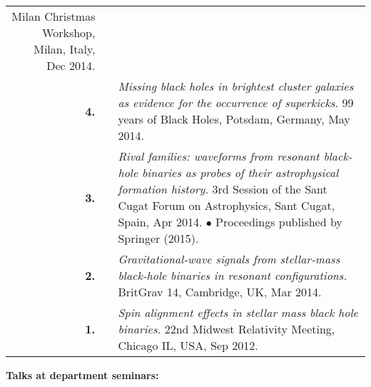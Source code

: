 {\begin{longtable}{rp{0.3cm}p{15.8cm}}
Milan Christmas Workshop, Milan, Italy, Dec 2014.
\vspace{0.05cm}\\
%
\textbf{4.} &  & \textit{Missing black holes in brightest cluster galaxies as evidence for the occurrence of superkicks.}
\newline{}
99 years of Black Holes, Potsdam, Germany, May 2014.
\vspace{0.05cm}\\
%
\textbf{3.} &  & \textit{Rival families: waveforms from resonant black-hole binaries as probes of their astrophysical formation history.}
\newline{}
3rd Session of the Sant Cugat Forum on Astrophysics, Sant Cugat, Spain, Apr 2014.
\newline{}
\textcolor{color1}{$\bullet$} Proceedings published by Springer (2015).
\vspace{0.05cm}\\
%
\textbf{2.} &  & \textit{Gravitational-wave signals from stellar-mass black-hole binaries in resonant configurations.}
\newline{}
BritGrav 14, Cambridge, UK, Mar 2014.
\vspace{0.05cm}\\
%
\textbf{1.} &  & \textit{Spin alignment effects in stellar mass black hole binaries.}
\newline{}
22nd Midwest Relativity Meeting, Chicago IL, USA, Sep 2012.
\vspace{0.05cm}\\
%
\end{longtable} }
\textcolor{color1}{\textbf{Talks at department seminars:}}
\vspace{-0.5cm}

